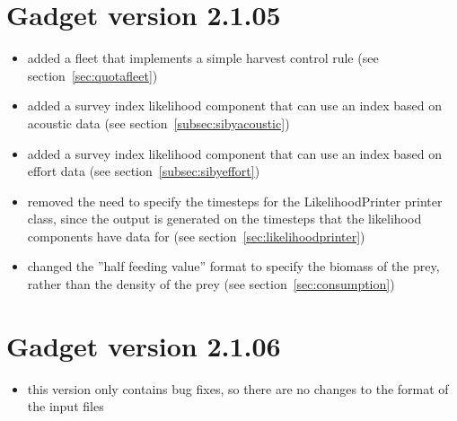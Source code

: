 \documentclass[10pt,twoside]{book}
\begin{document}
\section{Gadget version 2.1.05}\label{sec:v2105}
\begin{itemize}
\item added a fleet that implements a simple harvest control rule (see section~\ref{sec:quotafleet})
\item added a survey index likelihood component that can use an index based on acoustic data (see section~\ref{subsec:sibyacoustic})
\item added a survey index likelihood component that can use an index based on effort data (see section~\ref{subsec:sibyeffort})
\item removed the need to specify the timesteps for the LikelihoodPrinter printer class, since the output is generated on the timesteps that the likelihood components have data for (see section~\ref{sec:likelihoodprinter})
\item changed the ''half feeding value'' format to specify the biomass of the prey, rather than the density of the prey (see section~\ref{sec:consumption})
\end{itemize}

\section{Gadget version 2.1.06}\label{sec:v2106}
\begin{itemize}
\item this version only contains bug fixes, so there are no changes to the format of the input files
\end{itemize}
\end{document}
